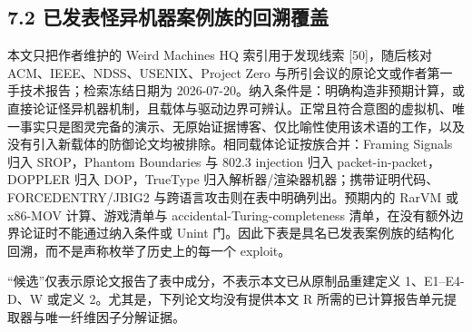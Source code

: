 \documentclass[
  11pt,
  a4paper,
]{ctexart}
\begin{document}
\hypertarget{72-ux5df2ux53d1ux8868ux602aux5f02ux673aux5668ux6848ux4f8bux65cfux7684ux56deux6eafux8986ux76d6}{%
\subsection{7.2
已发表怪异机器案例族的回溯覆盖}\label{72-ux5df2ux53d1ux8868ux602aux5f02ux673aux5668ux6848ux4f8bux65cfux7684ux56deux6eafux8986ux76d6}}

本文只把作者维护的 Weird Machines HQ 索引用于发现线索 {[}50{]}，随后核对
ACM、IEEE、NDSS、USENIX、Project Zero
与所引会议的原论文或作者第一手技术报告；检索冻结日期为
2026-07-20。纳入条件是：明确构造非预期计算，或直接论证怪异机器机制，且载体与驱动边界可辨认。正常且符合意图的虚拟机、唯一事实只是图灵完备的演示、无原始证据博客、仅比喻性使用该术语的工作，以及没有引入新载体的防御论文均被排除。相同载体论证按族合并：Framing
Signals 归入 SROP，Phantom Boundaries 与 802.3 injection 归入
packet-in-packet，DOPPLER 归入 DOP，TrueType
归入解析器/渲染器机器；携带证明代码、FORCEDENTRY/JBIG2
与跨语言攻击则在表中明确列出。预期内的 RarVM 或 x86-MOV
计算、游戏清单与 accidental-Turing-completeness
清单，在没有额外边界论证时不能通过纳入条件或 Unint
门。因此下表是具名已发表案例族的结构化回溯，而不是声称枚举了历史上的每一个 exploit。

``候选''仅表示原论文报告了表中成分，不表示本文已从原制品重建定义
1、E1--E4-D、W 或定义 2。尤其是，下列论文均没有提供本文 R
所需的已计算报告单元提取器与唯一纤维因子分解证据。
\end{document}
